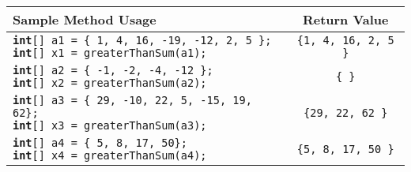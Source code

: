 \documentclass[12pt]{article}
\begin{document}
\begin{center}
\small
\begin{tabular}{| l | c |}
	\hline\rule{0pt}{4ex}
	Sample Method Usage & Return Value\\
	\hline\rule{0pt}{5ex}
	\makecell[l]{\texttt{\textbf{int}[] a1 = \{ 1, 4, 16, -19, -12, 2, 5 \}; } \\ \texttt{\textbf{int}[] x1 = greaterThanSum(a1);}} & \texttt{\{1, 4, 16, 2, 5 \}} \\
	\hline\rule{0pt}{5ex}
	\makecell[l]{\texttt{\textbf{int}[] a2 = \{ -1, -2, -4, -12 \}; } \\ \texttt{\textbf{int}[] x2 = greaterThanSum(a2);}} & \texttt{\{ \}} \\
	\hline\rule{0pt}{5ex}
	\makecell[l]{\texttt{\textbf{int}[] a3 = \{  29, -10, 22, 5, -15, 19, 62\}; } \\ \texttt{\textbf{int}[] x3 = greaterThanSum(a3);}} & \texttt{\{29, 22, 62  \}} \\
	\hline\rule{0pt}{5ex}
	\makecell[l]{\texttt{\textbf{int}[] a4 = \{ 5, 8, 17, 50\}; } \\ \texttt{\textbf{int}[] x4 = greaterThanSum(a4);}} & \texttt{\{5, 8, 17, 50 \}} \\
	\hline
		\end{tabular}
	\end{center}
	
\end{document}
